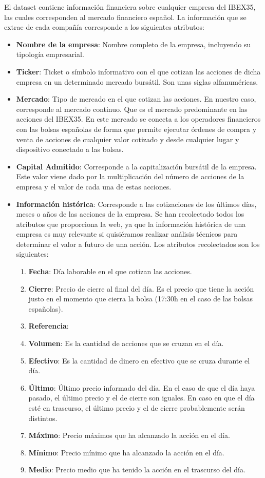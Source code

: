 \documentclass[12pt]{article}
\begin{document}
El dataset contiene información financiera sobre cualquier empresa del IBEX35, las cuales corresponden al mercado financiero español. La información que se extrae de cada compañía corresponde a los siguientes atributos:
\begin{itemize}
	\item \textbf{Nombre de la empresa}: Nombre completo de la empresa, incluyendo su tipología empresarial.
	\item \textbf{Ticker}: Ticket o símbolo informativo con el que cotizan las acciones de dicha empresa en un determinado mercado bursátil. Son unas siglas alfanuméricas.
	\item \textbf{Mercado}: Tipo de mercado en el que cotizan las acciones. En nuestro caso, corresponde al mercado continuo. Que es el mercado predominante en las acciones del IBEX35. En este mercado se conecta a los operadores financieros con las bolsas españolas de forma que permite ejecutar órdenes de compra y venta de acciones de cualquier valor cotizado y desde cualquier lugar y dispositivo conectado a las bolsas.
	\item \textbf{Capital Admitido}: Corresponde a la capitalización bursátil de la empresa. Este valor viene dado por la multiplicación del número de acciones de la empresa y el valor de cada una de estas acciones. 
	\item \textbf{Información histórica}: Corresponde a las cotizaciones de los últimos días, meses o años de las acciones de la empresa. Se han recolectado todos los atributos que proporciona la web, ya que la información histórica de una empresa es muy relevante si quisiéramos realizar análisis técnicos para determinar el valor a futuro de una acción. Los atributos recolectados son los siguientes:
	\begin{enumerate}
	\item \textbf{Fecha}: Día laborable en el que cotizan las acciones.
	\item \textbf{Cierre}: Precio de cierre al final del día. Es el precio que tiene la acción justo en el momento que cierra la bolsa (17:30h en el caso de las bolsas españolas).
	\item \textbf{Referencia}: 
	\item \textbf{Volumen}: Es la cantidad de acciones que se cruzan en el día.
	\item \textbf{Efectivo}: Es la cantidad de dinero en efectivo que se cruza durante el día.
	\item \textbf{Último}: Último precio informado del día. En el caso de que el día haya pasado, el último precio y el de cierre son iguales. En caso en que el día esté en trascurso, el último precio y el de cierre probablemente serán distintos.
	\item \textbf{Máximo}: Precio máximos que ha alcanzado la acción en el día.
	\item \textbf{Mínimo}: Precio mínimo que ha alcanzado la acción en el día.
	\item \textbf{Medio}: Precio medio que ha tenido la acción en el trascurso del día.
	\end{enumerate}
	

\end{itemize}
\end{document}
